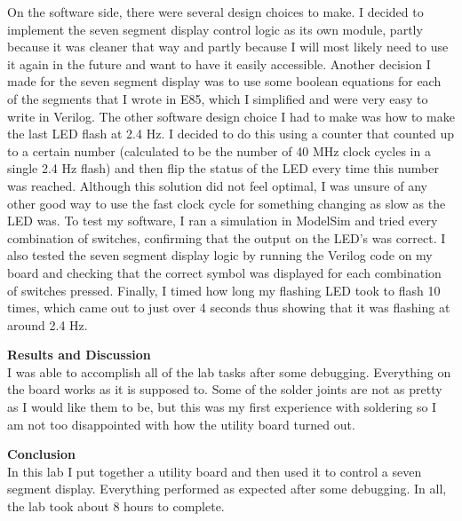 \documentclass[11pt,letterpaper]{article}
\begin{document}
On the software side, there were several design choices to make. I decided to implement the seven segment display control logic as its own module, partly because it was cleaner that way and partly because I will most likely need to use it again in the future and want to have it easily accessible. Another decision I made for the seven segment display was to use some boolean equations for each of the segments that I wrote in E85, which I simplified and were very easy to write in Verilog. The other software design choice I had to make was how to make the last LED flash at 2.4 Hz. I decided to do this using a counter that counted up to a certain number (calculated to be the number of 40 MHz clock cycles in a single 2.4 Hz flash) and then flip the status of the LED every time this number was reached. Although this solution did not feel optimal, I was unsure of any other good way to use the fast clock cycle for something changing as slow as the LED was. To test my software, I ran a simulation in ModelSim and tried every combination of switches, confirming that the output on the LED's was correct. I also tested the seven segment display logic by running the Verilog code on my board and checking that the correct symbol was displayed for each combination of switches pressed. Finally, I timed how long my flashing LED took to flash 10 times, which came out to just over 4 seconds thus showing that it was flashing at around 2.4 Hz.

\textbf{Results and Discussion}\\
I was able to accomplish all of the lab tasks after some debugging. Everything on the board works as it is supposed to. Some of the solder joints are not as pretty as I would like them to be, but this was my first experience with soldering so I am not too disappointed with how the utility board turned out.

\textbf{Conclusion}\\
In this lab I put together a utility board and then used it to control a seven segment display. Everything performed as expected after some debugging. In all, the lab took about 8 hours to complete.


\pagebreak
\end{document}
